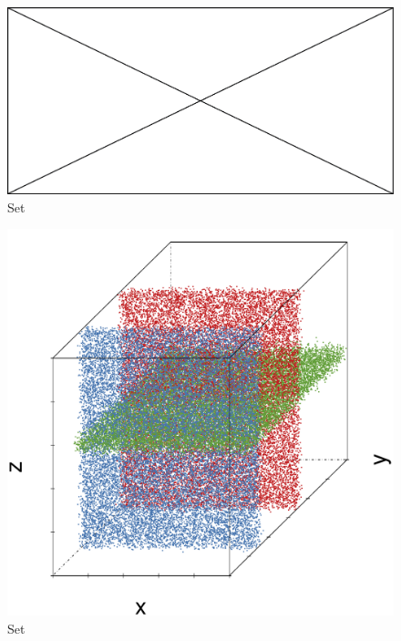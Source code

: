 \begin{subfigure}{0.23\textwidth}
	\centering
	\includegraphics[width=\textwidth]{img/missingfigure.png}
	\caption{Set \baakmanThree}
	\label{fig:3:simulated:datasets:baakman3}
\end{subfigure}			
\begin{subfigure}{0.23\textwidth}
	\centering
	\includegraphics[width=\textwidth]{3/img/datasetplot_ferdosi_5_60000.pdf}
	\caption{Set \ferdosiFive}
	\label{fig:3:simulated:datasets:ferdosi5}
\end{subfigure}	